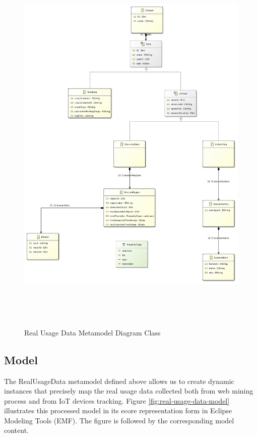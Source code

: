 \vspace{0.5cm}
\begin{figure}[H]
  \centering
    \includegraphics[height=19cm]{images/diagrams/RealUsageDataMetamodel.jpg}
  \caption{Real Usage Data Metamodel Diagram Class}
  \label{fig:real-usage-data-metamodel-diagram}
\end{figure}
\vspace{0.5cm}

\newpage
\subsection{Model}
\label{real-usage-data-model}

The RealUsageData metamodel defined above allows us to create dynamic instances that precisely map the real usage data collected both from web mining process and from IoT devices tracking. Figure \ref{fig:real-usage-data-model} illustrates this processed model in its ecore representation form in Eclipse Modeling Tools (EMF). The figure is followed by the corresponding model content.

